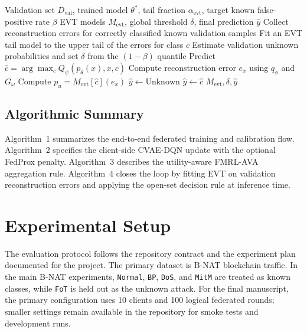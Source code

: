 \documentclass[10pt,twocolumn]{article}
\begin{document}
\begin{algorithm}[t]
\caption{EVT Calibration and Open-Set Inference}
\begin{algorithmic}[1]
\Require Validation set $D_{\mathrm{val}}$, trained model $\theta^\ast$, tail fraction $\alpha_{\mathrm{evt}}$, target known false-positive rate $\beta$
\Ensure EVT models $M_{\mathrm{evt}}$, global threshold $\delta$, final prediction $\hat{y}$
\State Collect reconstruction errors for correctly classified known validation samples
  \State Fit an EVT tail model to the upper tail of the errors for class $c$
\EndFor
\State Estimate validation unknown probabilities and set $\delta$ from the $(1-\beta)$ quantile
  \State Predict $\hat{c} = \arg\max_c Q_\psi(p_\theta(x),x,c)$
  \State Compute reconstruction error $e_x$ using $q_\phi$ and $G_\omega$
  \State Compute $p_u = M_{\mathrm{evt}}[\hat{c}](e_x)$
    \State $\hat{y} \gets \text{Unknown}$
  \Else
    \State $\hat{y} \gets \hat{c}$
  \EndIf
\EndFor
\State \Return $M_{\mathrm{evt}}, \delta, \hat{y}$
\end{algorithmic}
\end{algorithm}

\subsection{Algorithmic Summary}
Algorithm~1 summarizes the end-to-end federated training and calibration flow. Algorithm~2 specifies the client-side CVAE-DQN update with the optional FedProx penalty. Algorithm~3 describes the utility-aware FMRL-AVA aggregation rule. Algorithm~4 closes the loop by fitting EVT on validation reconstruction errors and applying the open-set decision rule at inference time.

\section{Experimental Setup}
The evaluation protocol follows the repository contract and the experiment plan documented for the project. The primary dataset is B-NAT blockchain traffic. In the main B-NAT experiments, \texttt{Normal}, \texttt{BP}, \texttt{DoS}, and \texttt{MitM} are treated as known classes, while \texttt{FoT} is held out as the unknown attack. For the final manuscript, the primary configuration uses 10 clients and 100 logical federated rounds; smaller settings remain available in the repository for smoke tests and development runs.
\end{document}
